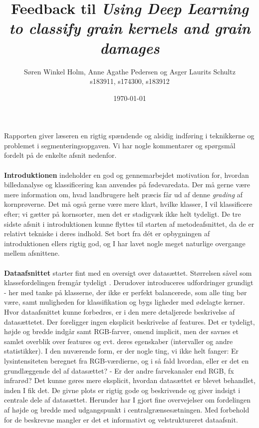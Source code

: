 \documentclass[12pt,fleqn,]{article}
\title{\vspace*{-4cm}Feedback til \textit{
		Using Deep Lear​ning to classif​y grain kernels​ and grain dama​ges}}
\author{Søren Winkel Holm, Anne Agathe Pedersen og Asger Laurits Schultz\\
s183911, s174300, s183912}
\date{\today}
\begin{document}
\maketitle
\noindent
Rapporten giver læseren en rigtig spændende og alsidig indføring i teknikkerne og problemet i segmenteringsopgaven. Vi har nogle kommentarer og spørgsmål fordelt på de enkelte afsnit nedenfor.
\\
\\
\textbf{Introduktionen} indeholder en god og gennemarbejdet motivation for, hvordan billedanalyse og klassificering kan anvendes på fødevaredata. Der må gerne være mere information om, hvad landbrugere helt præcis får ud af denne \textit{grading} af kornprøverne. Det må også gerne være mere klart, hvilke klasser, I vil klassificere efter; vi gætter på kornsorter, men det er stadigvæk ikke helt tydeligt. De tre sidste afsnit i introduktionen kunne flyttes til starten af metodeafsnittet, da de er relativt tekniske i deres indhold. Set bort fra dét er opbygningen af introduktionen ellers rigtig god, og I har lavet nogle meget naturlige overgange mellem afsnittene. 
\\
\\
\textbf{Dataafsnittet} starter fint med en oversigt over datasættet. Størrelsen såvel som klassefordelingen fremgår tydeligt . Derudover introduceres udfordringer grundigt - her med tanke på klasserne, der ikke er perfekt balancerede, som alle ting bør være, samt muligheden for klassifikation og bygs ligheder med ødelagte kerner. Hvor dataafsnittet kunne forbedres, er i den mere detaljerede beskrivelse af datasættetet. Der foreligger ingen eksplicit beskrivelse af features. Det er tydeligt, højde og bredde indgår samt RGB-farver, omend implicit, men der savnes et samlet overblik over features og evt. deres egenskaber (intervaller og andre statistikker). I den nuværende form, er der nogle ting, vi ikke helt fanger: Er lysintensiteten beregnet fra RGB-værdierne, og i så fald hvordan, eller er det en grundlæggende del af datasættet? - Er der andre farvekanaler end RGB, fx infrarød? Det kunne gøres mere eksplicit, hvordan datasættet er blevet behandlet, inden I fik det. De givne plots er rigtig gode og beskrivende og giver indsigt i centrale dele af datasættet. Herunder har I gjort fine overvejelser om fordelingen af højde og bredde med udgangspunkt i centralgrænsesætningen. Med forbehold for de beskrevne mangler er det et informativt og velstruktureret dataafsnit.
\\
\\
\end{document}
